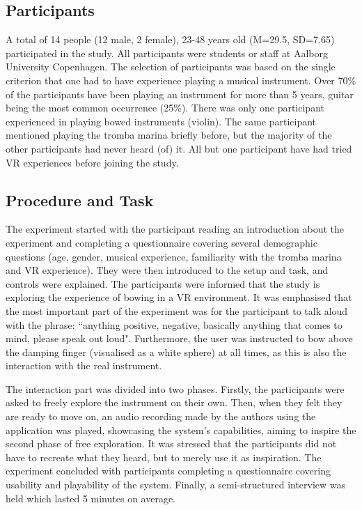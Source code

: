 \documentclass[dvipsnames, pdftex]{article}
\begin{document}
\subsection{Participants}

A total of 14 people (12 male, 2 female), 23-48 years old (M=29.5, SD=7.65)  participated in the study. All participants were students or staff at Aalborg University Copenhagen. The selection of participants was based on the single criterion that one had to have experience playing a musical instrument. Over 70\% of the participants have been playing an instrument for more than 5 years, guitar being the most common occurrence (25\%). There was only one participant experienced in playing bowed instruments (violin). The same participant mentioned playing the tromba marina briefly before, but the majority of the other participants had never heard (of) it. All but one participant have had tried VR experiences before joining the study. 

\subsection{Procedure and Task}

The experiment started with the participant reading an introduction about the experiment and completing a questionnaire covering several demographic questions (age, gender, musical experience, familiarity with the tromba marina and VR experience). They were then introduced to the setup and task, and controls were explained. The participants were informed that the study is exploring the experience of bowing in a VR environment. It was emphasised that the most important part of the experiment was for the participant to talk aloud with the phrase: ``anything positive, negative, basically anything that comes to mind, please speak out loud". Furthermore, the user was instructed to bow above the damping finger (visualised as a white sphere) at all times, as this is also the interaction with the real instrument. 

The interaction part was divided into two phases. Firstly, the participants were asked to freely explore the instrument on their own. Then, when they felt they are ready to move on, an audio recording made by the authors using the application was played, showcasing the system's capabilities, aiming to inspire the second phase of free exploration. It was stressed that the participants did not have to recreate what they heard, but to merely use it as inspiration. The experiment concluded with participants completing a questionnaire covering usability and playability of the system. Finally, a semi-structured interview was held which lasted 5 minutes on average. 
\end{document}
